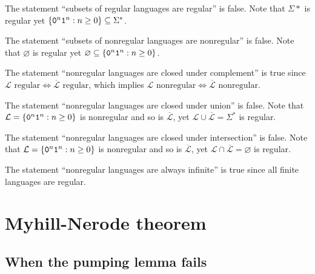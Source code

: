 \documentclass{notes}
\begin{document}
\begin{eg}
  The statement ``subsets of regular languages are regular'' is false.
  Note that $\Sigma*$ is regular yet $\left \{ \verb~0~^n \verb~1~^n : n \geq 0 \right \} \subseteq \Sigma^*$.
\end{eg}

\begin{eg}
  The statement ``subsets of nonregular languages are nonregular'' is false.
  Note that $\varnothing$ is regular yet $\varnothing \subseteq \left \{ \verb~0~^n \verb~1~^n : n \geq 0 \right \}$.
\end{eg}

\begin{eg}
  The statement ``nonregular languages are closed under complement'' is true since $\text{$\mathcal L$ regular} \Leftrightarrow \text{$\overline{\mathcal L}$ regular}$, which implies $\text{$\mathcal L$ nonregular} \Leftrightarrow \text{$\overline{\mathcal L}$ nonregular}$.
\end{eg}

\begin{eg}
  The statement ``nonregular languages are closed under union'' is false.
  Note that $\mathcal L = \left \{ \verb~0~^n \verb~1~^n : n \geq 0 \right \}$ is nonregular and so is $\overline{\mathcal L}$, yet $\mathcal L \cup \overline{\mathcal L} = \Sigma^*$ is regular.
\end{eg}

\begin{eg}
  The statement ``nonregular languages are closed under intersection'' is false.
  Note that $\mathcal L = \left \{ \verb~0~^n \verb~1~^n : n \geq 0 \right \}$ is nonregular and so is $\overline{\mathcal L}$, yet $\mathcal L \cap \overline{\mathcal L} = \varnothing$ is regular.
\end{eg}

\begin{eg}
  The statement ``nonregular languages are always infinite'' is true since all finite languages are regular.
\end{eg}

\newpage

\section{Myhill-Nerode theorem}

\subsection{When the pumping lemma fails}
\end{document}
